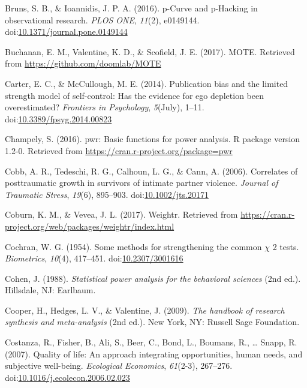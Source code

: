 \documentclass[man]{apa6}
\theoremstyle{definition}
\theoremstyle{definition}
\theoremstyle{definition}
\theoremstyle{remark}
\begin{document}
\hypertarget{ref-Bruns2016}{}
Bruns, S. B., \& Ioannidis, J. P. A. (2016). p-Curve and p-Hacking in
observational research. \emph{PLOS ONE}, \emph{11}(2), e0149144.
doi:\href{https://doi.org/10.1371/journal.pone.0149144}{10.1371/journal.pone.0149144}

\hypertarget{ref-Buchanan2017}{}
Buchanan, E. M., Valentine, K. D., \& Scofield, J. E. (2017). MOTE.
Retrieved from \url{https://github.com/doomlab/MOTE}

\hypertarget{ref-Carter2014}{}
Carter, E. C., \& McCullough, M. E. (2014). Publication bias and the
limited strength model of self-control: Has the evidence for ego
depletion been overestimated? \emph{Frontiers in Psychology},
\emph{5}(July), 1--11.
doi:\href{https://doi.org/10.3389/fpsyg.2014.00823}{10.3389/fpsyg.2014.00823}

\hypertarget{ref-Champely2016}{}
Champely, S. (2016). pwr: Basic functions for power analysis. R package
version 1.2-0. Retrieved from
\url{https://cran.r-project.org/package=pwr}

\hypertarget{ref-Cobb2006}{}
Cobb, A. R., Tedeschi, R. G., Calhoun, L. G., \& Cann, A. (2006).
Correlates of posttraumatic growth in survivors of intimate partner
violence. \emph{Journal of Traumatic Stress}, \emph{19}(6), 895--903.
doi:\href{https://doi.org/10.1002/jts.20171}{10.1002/jts.20171}

\hypertarget{ref-Coburn2017}{}
Coburn, K. M., \& Vevea, J. L. (2017). Weightr. Retrieved from
\url{https://cran.r-project.org/web/packages/weightr/index.html}

\hypertarget{ref-Cochran1954}{}
Cochran, W. G. (1954). Some methods for strengthening the common
\(\chi\) 2 tests. \emph{Biometrics}, \emph{10}(4), 417--451.
doi:\href{https://doi.org/10.2307/3001616}{10.2307/3001616}

\hypertarget{ref-Cohen1988}{}
Cohen, J. (1988). \emph{Statistical power analysis for the behavioral
sciences} (2nd ed.). Hillsdale, NJ: Earlbaum.

\hypertarget{ref-Cooper2009}{}
Cooper, H., Hedges, L. V., \& Valentine, J. (2009). \emph{The handbook
of research synthesis and meta-analysis} (2nd ed.). New York, NY:
Russell Sage Foundation.

\hypertarget{ref-Costanza2007}{}
Costanza, R., Fisher, B., Ali, S., Beer, C., Bond, L., Boumans, R.,
\ldots{} Snapp, R. (2007). Quality of life: An approach integrating
opportunities, human needs, and subjective well-being. \emph{Ecological
Economics}, \emph{61}(2-3), 267--276.
doi:\href{https://doi.org/10.1016/j.ecolecon.2006.02.023}{10.1016/j.ecolecon.2006.02.023}
\end{document}
